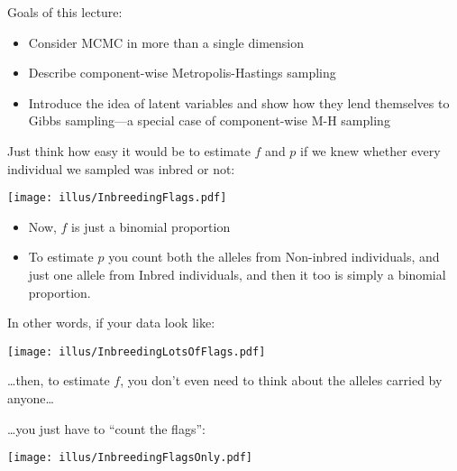 








Goals of this lecture:
\begin{itemize}
\item Consider MCMC in more than a single dimension
\item Describe component-wise Metropolis-Hastings sampling 
\item Introduce the idea of latent variables and show how they lend themselves to Gibbs sampling---a special case of component-wise M-H sampling
\end{itemize}



Just think how easy it would be to estimate $f$ and $p$ if we knew whether every individual we sampled was inbred or not:
\enlargethispage*{1000pt}
\begin{center}
\texttt{[image: illus/InbreedingFlags.pdf]}
\end{center}
\begin{itemize}
\item Now, $f$ is just a binomial proportion
\item To estimate $p$ you count both the alleles from Non-inbred individuals, and just one allele from Inbred individuals, and then it too is simply a binomial proportion.
\end{itemize}

\newpage

In other words, if your data look like:
\begin{center}
\texttt{[image: illus/InbreedingLotsOfFlags.pdf]}
\end{center}
\ldots then, to estimate $f$, you don't even need to think about the alleles carried by anyone\ldots

\newpage
\ldots you just have to ``count the flags'':
\begin{center}
\texttt{[image: illus/InbreedingFlagsOnly.pdf]}
\end{center}



